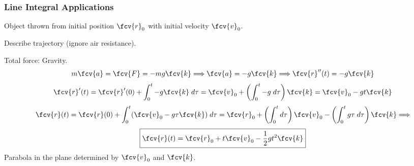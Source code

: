 \begin{frame}
\frametitle{Line Integral Applications}

  Object thrown from initial position $\fcv{r}_0$ with initial velocity $\fcv{v}_0$.

  Describe trajectory (ignore air resistance).\pause

  Total force: Gravity.
%
$$m\fcv{a} = \fcv{F} =  -mg \fcv{k} \Longrightarrow \fcv{a} =
-g \fcv{k} \Longrightarrow \fcv{r}''(t) = -g \fcv{k}$$
\pause
%
$$\fcv{r}'(t) = \fcv{r}'(0) + \int_{0}^t -g \fcv{k} \; d\tau = \fcv{v}_0 + \left(\int_{0}^t -g\; d\tau \right) \fcv{k} = \fcv{v}_0 -gt \fcv{k}$$
%
\pause
$$\fcv{r}(t) = \fcv{r}(0) + \int_{0}^t (\fcv{v}_0-g\tau \fcv{k}) \; d\tau = \fcv{r}_0 + \left( \int_0^t d\tau \right) \fcv{v}_0 - \left( \int_0^t g\tau \; d\tau \right) \fcv{k} \Longrightarrow$$
%
$$\boxed{\fcv{r}(t) = \fcv{r}_0  +t  \fcv{v}_0 - \frac{1}{2}gt^2 \fcv{k}}$$
\pause
Parabola in the plane determined by $\fcv{v}_0$ and $\fcv{k}$.
\end{frame}